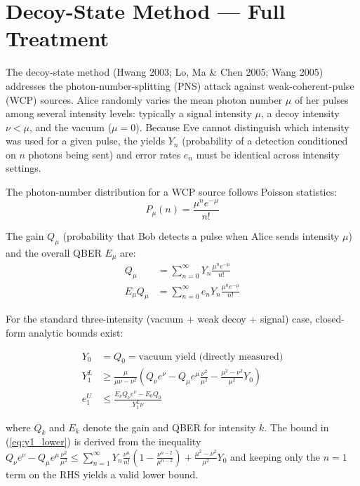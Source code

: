 \documentclass[11pt,a4paper,oneside]{report}
\begin{document}
\section{Decoy-State Method — Full Treatment}

The decoy-state method (Hwang 2003; Lo, Ma \& Chen 2005; Wang 2005) addresses the photon-number-splitting (PNS) attack against weak-coherent-pulse (WCP) sources. Alice randomly varies the mean photon number $\mu$ of her pulses among several intensity levels: typically a signal intensity $\mu$, a decoy intensity $\nu < \mu$, and the vacuum ($\mu = 0$). Because Eve cannot distinguish which intensity was used for a given pulse, the yields $Y_n$ (probability of a detection conditioned on $n$ photons being sent) and error rates $e_n$ must be identical across intensity settings.

The photon-number distribution for a WCP source follows Poisson statistics:
\begin{equation}
P_\mu(n) = \frac{\mu^n e^{-\mu}}{n!}
\end{equation}

The gain $Q_\mu$ (probability that Bob detects a pulse when Alice sends intensity $\mu$) and the overall QBER $E_\mu$ are:
\begin{align}
Q_\mu &= \sum_{n=0}^{\infty} Y_n \frac{\mu^n e^{-\mu}}{n!} \\
E_\mu Q_\mu &= \sum_{n=0}^{\infty} e_n Y_n \frac{\mu^n e^{-\mu}}{n!}
\end{align}

For the standard three-intensity (vacuum + weak decoy + signal) case, closed-form analytic bounds exist:

\begin{align}
Y_0 &= Q_0 = \text{vacuum yield (directly measured)} \\
Y_1^L &\geq \frac{\mu}{\mu\nu - \nu^2}\left(Q_\nu e^{\nu} - Q_\mu e^{\mu}\frac{\nu^2}{\mu^2} - \frac{\mu^2 - \nu^2}{\mu^2}Y_0\right) \label{eq:y1_lower} \\
e_1^U &\leq \frac{E_\nu Q_\nu e^{\nu} - E_0 Q_0}{Y_1^L \nu} \label{eq:e1_upper}
\end{align}

where $Q_k$ and $E_k$ denote the gain and QBER for intensity $k$. The bound in (\ref{eq:y1_lower}) is derived from the inequality $Q_\nu e^\nu - Q_\mu e^\mu\frac{\nu^2}{\mu^2} \leq \sum_{n=1}^{\infty} Y_n \frac{\nu^n}{n!}(1 - \frac{\nu^{n-2}}{\mu^{n-2}}) + \frac{\mu^2-\nu^2}{\mu^2}Y_0$ and keeping only the $n=1$ term on the RHS yields a valid lower bound.
\end{document}
